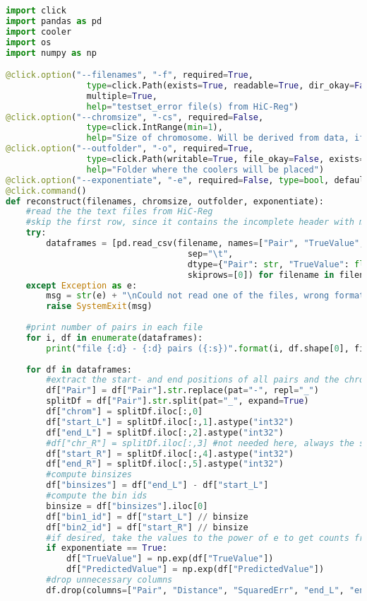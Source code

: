 \begin{lstlisting}[language=python, caption=Custom script to convert HiC-Reg's text output to cooler format, label=list:methods:hicreg2cool]
import click
import pandas as pd
import cooler
import os
import numpy as np

@click.option("--filenames", "-f", required=True,
				type=click.Path(exists=True, readable=True, dir_okay=False),
				multiple=True,
				help="testset_error file(s) from HiC-Reg") 
@click.option("--chromsize", "-cs", required=False,
				type=click.IntRange(min=1), 
				help="Size of chromosome. Will be derived from data, if not specified")
@click.option("--outfolder", "-o", required=True,
				type=click.Path(writable=True, file_okay=False, exists=True),
				help="Folder where the coolers will be placed")
@click.option("--exponentiate", "-e", required=False, type=bool, default=False, show_default=True, help="exponentiate count values")
@click.command()
def reconstruct(filenames, chromsize, outfolder, exponentiate):
	#read the the text files from HiC-Reg
	#skip the first row, since it contains the incomplete header with missing "Distance"
	try:
		dataframes = [pd.read_csv(filename, names=["Pair", "TrueValue", "PredictedValue", "SquaredErr", "Distance"], 
									sep="\t", 
									dtype={"Pair": str, "TrueValue": float, "PredictedValue": float, "SquaredErr": float, "Distance": int}, 
									skiprows=[0]) for filename in filenames]
	except Exception as e:
		msg = str(e) + "\nCould not read one of the files, wrong format?"
		raise SystemExit(msg)
		
	#print number of pairs in each file
	for i, df in enumerate(dataframes):
		print("file {:d} - {:d} pairs ({:s})".format(i, df.shape[0], filenames[i]))
	
	for df in dataframes:
		#extract the start- and end positions of all pairs and the chromosome
		df["Pair"] = df["Pair"].str.replace(pat="-", repl="_")
		splitDf = df["Pair"].str.split(pat="_", expand=True)
		df["chrom"] = splitDf.iloc[:,0]
		df["start_L"] = splitDf.iloc[:,1].astype("int32")
		df["end_L"] = splitDf.iloc[:,2].astype("int32")
		#df["chr_R"] = splitDf.iloc[:,3] #not needed here, always the same as chr_L
		df["start_R"] = splitDf.iloc[:,4].astype("int32")
		df["end_R"] = splitDf.iloc[:,5].astype("int32")
		#compute binsizes
		df["binsizes"] = df["end_L"] - df["start_L"]
		#compute the bin ids
		binsize = df["binsizes"].iloc[0]
		df["bin1_id"] = df["start_L"] // binsize
		df["bin2_id"] = df["start_R"] // binsize
		#if desired, take the values to the power of e to get counts from log-scale values
		if exponentiate == True:
			df["TrueValue"] = np.exp(df["TrueValue"])
			df["PredictedValue"] = np.exp(df["PredictedValue"])
		#drop unnecessary columns
		df.drop(columns=["Pair", "Distance", "SquaredErr", "end_L", "end_R", "start_L", "start_R"], inplace=True)	
	

\end{lstlisting}
